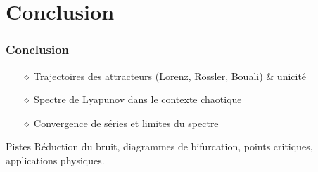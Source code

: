 \section{Conclusion}

\begin{frame}
    \begin{center}
    \vspace{0.5cm}
    \end{center}
\end{frame}

\begin{frame}
    \frametitle{Conclusion}
    \begin{itemize}
        \setlength\itemsep{1em}
        \item[$\diamond$] Trajectoires des attracteurs (Lorenz, Rössler, Bouali) \& unicité
        \item[$\diamond$] Spectre de Lyapunov dans le contexte chaotique
        \item[$\diamond$] Convergence de séries et limites du spectre
    \end{itemize}
    \vspace{0.5cm}
    \begin{colorblock}{Pistes}
        Réduction du bruit, diagrammes de bifurcation, points critiques, applications physiques.
    \end{colorblock}
\end{frame}

\begin{frame}
    \begin{center}
    \vspace{0.5cm}
    \end{center}
\end{frame}
